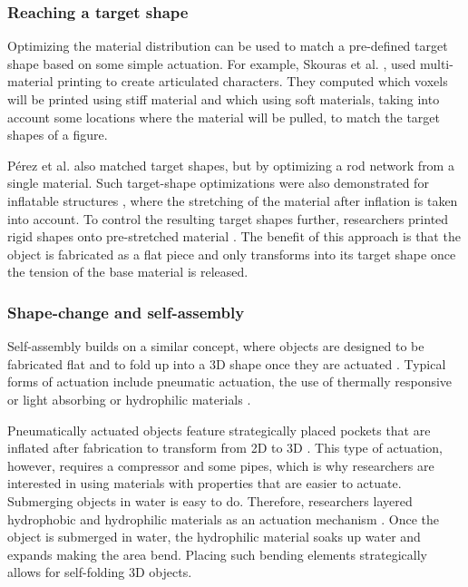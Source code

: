 \subsubsection{Reaching a target shape}
Optimizing the material distribution can be used to match a pre-defined target shape based on some simple actuation. For example, Skouras et al. \cite{Skouras2013a}, used multi-material printing to create articulated characters. They computed which voxels will be printed using stiff material and which using soft materials, taking into account some locations where the material will be pulled, to match the target shapes of a figure. {P{\'{e}}rez et al. \cite{Perez2015} also matched target shapes, but by optimizing a rod network from a single material. Such target-shape optimizations were also demonstrated for inflatable structures \cite{Skouras2012}, where the stretching of the material after inflation is taken into account. To control the resulting target shapes further, researchers printed rigid shapes onto pre-stretched material \cite{Perez2017, Guseinov2017}. The benefit of this approach is that the object is fabricated as a flat piece and only transforms into its target shape once the tension of the base material is released. 


\subsubsection{Shape-change and self-assembly}
Self-assembly builds on a similar concept, where objects are designed to be fabricated flat and to fold up into a 3D shape once they are actuated  \cite{Tibbits2014, Raviv2015}. Typical forms of actuation include pneumatic actuation, the use of thermally responsive or light absorbing or hydrophilic materials \cite{Geryak2014, VanManen2018}. 

Pneumatically actuated objects feature strategically placed pockets that are inflated after fabrication to transform from 2D to 3D \cite{Ou2016, Overvelde2016a}. This type of actuation, however, requires a compressor and some pipes, which is why researchers are interested in using materials with properties that are easier to actuate. Submerging objects in water is easy to do. Therefore, researchers layered hydrophobic and hydrophilic materials as an actuation mechanism \cite{Raviv2015, Wang2017}. Once the object is submerged in water, the hydrophilic material soaks up water and expands making the area bend. Placing such bending elements strategically allows for self-folding 3D objects.

}
